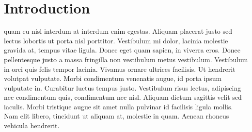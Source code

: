 \chapter{Introduction}
\label{chap:intro}

 quam eu nisl interdum at interdum enim egestas. Aliquam placerat justo sed lectus
lobortis ut porta nisl porttitor. Vestibulum mi dolor, lacinia molestie gravida
at, tempus vitae ligula. Donec eget quam sapien, in viverra eros. Donec
pellentesque justo a massa fringilla non vestibulum metus vestibulum.
Vestibulum in orci quis felis tempor lacinia. Vivamus ornare ultrices
facilisis. Ut hendrerit volutpat vulputate. Morbi condimentum venenatis augue,
id porta ipsum vulputate in. Curabitur luctus tempus justo. Vestibulum risus
lectus, adipiscing nec condimentum quis, condimentum nec nisl. Aliquam dictum
sagittis velit sed iaculis. Morbi tristique augue sit amet nulla pulvinar id
facilisis ligula mollis. Nam elit libero, tincidunt ut aliquam at, molestie in
quam. Aenean rhoncus vehicula hendrerit.
